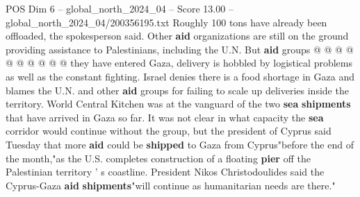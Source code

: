 \begin{textsample}{POS Dim 6 – global\_north\_2024\_04 – Score 13.00 – global\_north\_2024\_04/200356195.txt}
Roughly 100 tons have already been offloaded, the spokesperson said.
Other \textbf{aid} organizations are still on the ground providing assistance to Palestinians, including the U.N.
But \textbf{aid} groups @ @ @ @ @ @ @ @ @ @ they have entered Gaza, delivery is hobbled by logistical problems as well as the constant fighting.
Israel denies there is a food shortage in Gaza and blames the U.N. and other \textbf{aid} groups for failing to scale up deliveries inside the territory.
World Central Kitchen was at the vanguard of the two \textbf{sea} \textbf{shipments} that have arrived in Gaza so far.
It was not clear in what capacity the \textbf{sea} corridor would continue without the group, but the president of Cyprus said Tuesday that more \textbf{aid} could be \textbf{shipped} to Gaza from Cyprus"before the end of the month,"as the U.S. completes construction of a floating \textbf{pier} off the Palestinian territory ' s coastline.
President Nikos Christodoulides said the Cyprus-Gaza \textbf{aid} \textbf{shipments}"will continue as humanitarian needs are there."

\end{textsample}
